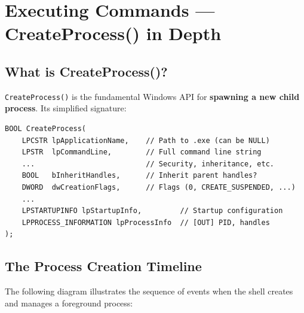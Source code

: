 \documentclass[12pt,a4paper]{article}
\begin{document}
\section{Executing Commands --- CreateProcess() in Depth}

\subsection{What is CreateProcess()?}

\texttt{CreateProcess()} is the fundamental Windows API for \textbf{spawning a new child process}. Its simplified signature:

\begin{lstlisting}
BOOL CreateProcess(
    LPCSTR lpApplicationName,    // Path to .exe (can be NULL)
    LPSTR  lpCommandLine,        // Full command line string
    ...                          // Security, inheritance, etc.
    BOOL   bInheritHandles,      // Inherit parent handles?
    DWORD  dwCreationFlags,      // Flags (0, CREATE_SUSPENDED, ...)
    ...
    LPSTARTUPINFO lpStartupInfo,         // Startup configuration
    LPPROCESS_INFORMATION lpProcessInfo  // [OUT] PID, handles
);
\end{lstlisting}

\subsection{The Process Creation Timeline}

The following diagram illustrates the sequence of events when the shell creates and manages a foreground process:
\end{document}
